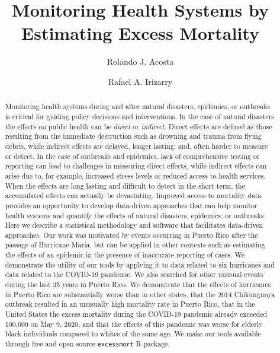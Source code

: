 \documentclass[11pt]{article}
\begin{document}
\title{Monitoring Health Systems by Estimating Excess Mortality}
 
\author[1]{Rolando J. Acosta}
\author[1,2]{Rafael A. Irizarry}
\date{}

\maketitle
\setcounter{page}{0}
\begin{abstract}
Monitoring health systems during and after natural disasters, epidemics, or outbreaks is critical for guiding policy decisions and interventions. In the case of natural disasters the effects on public health can be \textit{direct} or \textit{indirect}. Direct effects are defined as those resulting from the immediate destruction such as drowning and trauma from flying debris, while indirect effects are delayed, longer lasting, and, often harder to measure or detect. In the case of outbreaks and epidemics, lack of comprehensive testing or reporting can lead to challenges in measuring direct effects, while indirect effects can arise due to, for example, increased stress levels or reduced access to health services. When the effects are long lasting and difficult to detect in the short term, the accumulated effects can actually be devastating. Improved access to mortality data provides an opportunity to develop data-driven approaches that can help monitor health systems and quantify the effects of natural disasters, epidemics, or outbreaks. Here we describe a statistical methodology and software that facilitates data-driven approaches. Our work was motivated by events occurring in Puerto Rico after the passage of Hurricane Mar\'ia, but can be applied in other contexts such as estimating the effects of an epidemic in the presence of inaccurate reporting of cases. We demonstrate the utility of our tools by applying it to data related to six hurricanes and data related to the COVID-19 pandemic. We also searched for other unusual events during the last 35 years in Puerto Rico. We demonstrate that the effects of hurricanes in Puerto Rico are substantially worse than in other states, that the 2014 Chikungunya outbreak resulted in an unusually high mortality rate in Puerto Rico, that in the United States the excess mortality during the COVID-19 pandemic already exceeded 100,000 on May 9, 2020, and that the effects of this pandemic was worse for elderly black individuals compared to whites of the same age. We make our tools available through free and open source \verb+excessmort+ R package.
\end{abstract}
\end{document}
